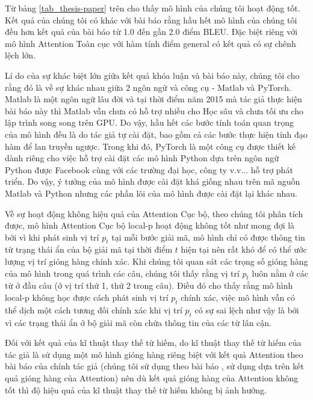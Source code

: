Từ bảng \ref{tab_thesis-paper} trên cho thấy mô hình của chúng tôi hoạt động tốt. Kết quả của chúng tôi có khác với bài báo rằng hầu hết mô hình của chúng tôi đều hơn kết quả của bài báo từ 1.0 đến gần 2.0 điểm BLEU. Đặc biệt riêng với mô hình Attention Toàn cục với hàm tính điểm general có kết quả có sự chênh lệch lớn.

Lí do của sự khác biệt lớn giữa kết quả khóa luận và bài báo này, chúng tôi cho rằng đó là về sự khác nhau giữa 2 ngôn ngữ và công cụ - Matlab và PyTorch. Matlab là một ngôn ngữ lâu đời và tại thời điểm năm 2015 mà tác giả thực hiện bài báo này thì Matlab vẫn chưa có hỗ trợ nhiều cho Học sâu và chưa tối ưu cho lập trình song song trên GPU. Do vậy, hầu hết các bước tính toán quan trọng của mô hình đều là do tác giả tự cài đặt, bao gồm cả các bước thực hiện tính đạo hàm để lan truyền ngược. Trong khi đó, PyTorch là một công cụ được thiết kế dành riêng cho việc hỗ trợ cài đặt các mô hình Python dựa trên ngôn ngữ Python được Facebook cùng với các trường đại học, công ty v.v... hỗ trợ phát triển. Do vậy, ý tưởng của mô hình được cài đặt khá giống nhau trên mã nguồn Matlab và Python nhưng các phần lõi của mô hình được cài đặt lại khác nhau.

Về sự hoạt động không hiệu quả của Attention Cục bộ, theo chúng tôi phân tích được, mô hình Attention Cục bộ local-p hoạt động không tốt như mong đợi là bởi vì khi phát sinh vị trí $p_t$ tại mỗi bước giải mã, mô hình chỉ có được thông tin từ trạng thái ẩn của bộ giải mã tại thời điểm $t$ hiện tại nên rất khó để có thể ước lượng vị trí gióng hàng chính xác. Khi chúng tôi quan sát các trọng số gióng hàng của mô hình trong quá trình các câu, chúng tôi thấy rằng vị trí $p_t$ luôn nằm ở các từ ở đầu câu (ở vị trí thứ 1, thứ 2 trong câu). Điều đó cho thấy rằng mô hình local-p không học được cách phát sinh vị trí $p_t$ chính xác, việc mô hình vẫn có thể dịch một cách tương đối chính xác khi vị trí $p_t$ có sự sai lệch như vậy là bởi vì các trạng thái ẩn ở bộ giải mã còn chứa thông tin của các từ lân cận.

Đối với kết quả của kĩ thuật thay thế từ hiếm, do kĩ thuật thay thế từ hiếm của tác giả là sử dụng một mô hình gióng hàng riêng biệt với kết quả Attention theo bài báo của chính tác giả \cite{rarewordhandling} (chúng tôi sử dụng theo bài báo \cite{JeanUnkRepl}, sử dụng dựa trên kết quả gióng hàng của Attention) nên dù kết quả gióng hàng của Attention không tốt thì độ hiệu quả của kĩ thuật thay thế từ hiếm không bị ảnh hưởng.

